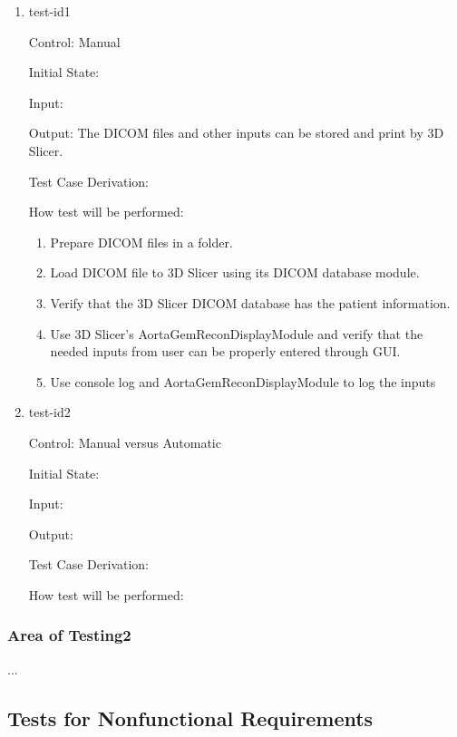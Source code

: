 \documentclass[12pt, titlepage]{article}
\begin{document}
\begin{enumerate}

\item{test-id1\\}

Control: Manual
					
Initial State: 
					
Input: 
					
Output: The DICOM files and other inputs can be stored and print by 3D Slicer.

Test Case Derivation: 
					
How test will be performed: \\
\begin{enumerate}
\item{Prepare DICOM files in a folder.}
\item{Load DICOM file to 3D Slicer using its DICOM database module.}
\item{Verify that the 3D Slicer DICOM database has the patient information.}
\item{Use 3D Slicer's AortaGemReconDisplayModule and verify that the needed inputs from user can be properly entered through GUI.}
\item{Use console log and AortaGemReconDisplayModule to log the inputs}
\end{enumerate}
					
\item{test-id2\\}

Control: Manual versus Automatic
					
Initial State: 
					
Input: 
					
Output: 

Test Case Derivation: 

How test will be performed: 

\end{enumerate}

\subsubsection{Area of Testing2}

...

\subsection{Tests for Nonfunctional Requirements}
\end{document}
